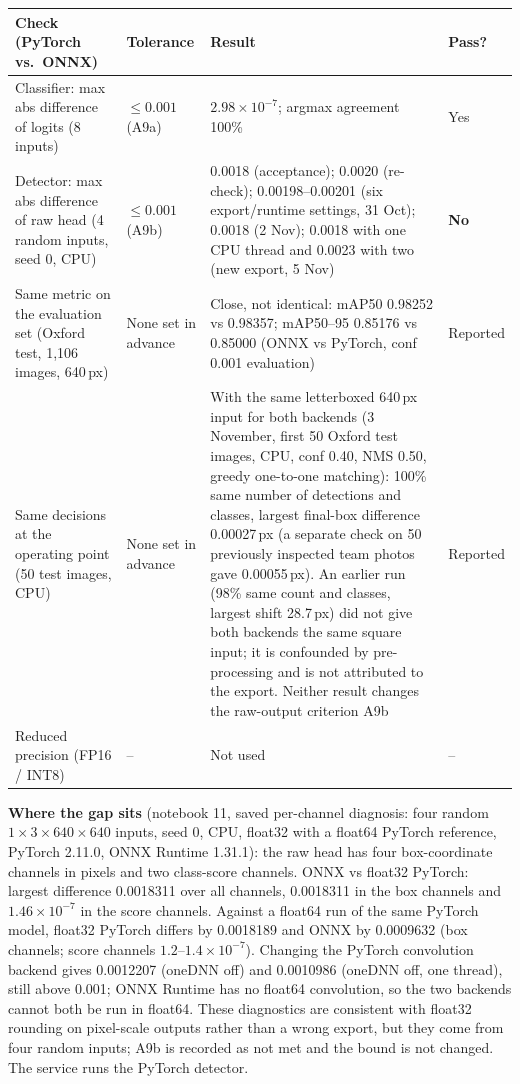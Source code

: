 \documentclass[11pt,a4paper]{article}
\begin{document}
{\small
\begin{tabularx}{\linewidth}{@{}P{5.0cm} P{2.0cm} Y l@{}}
\toprule
Check (PyTorch vs.\ ONNX) & Tolerance & Result & Pass? \\
\midrule
Classifier: max abs difference of logits (8 inputs) & $\leq 0.001$ (A9a) & $2.98\times10^{-7}$; argmax agreement 100\% & Yes \\
Detector: max abs difference of raw head (4 random inputs, seed 0, CPU) & $\leq 0.001$ (A9b) & 0.0018 (acceptance); 0.0020 (re-check); 0.00198--0.00201 (six export/runtime settings, 31 Oct); 0.0018 (2 Nov); 0.0018 with one CPU thread and 0.0023 with two (new export, 5 Nov) & \textbf{No} \\
Same metric on the evaluation set (Oxford test, 1,106 images, 640\,px) & None set in advance & Close, not identical: mAP50 0.98252 vs 0.98357; mAP50--95 0.85176 vs 0.85000 (ONNX vs PyTorch, conf 0.001 evaluation) & Reported \\
Same decisions at the operating point (50 test images, CPU) & None set in advance & With the same letterboxed 640\,px input for both backends (3 November, first 50 Oxford test images, CPU, conf 0.40, NMS 0.50, greedy one-to-one matching): 100\% same number of detections and classes, largest final-box difference 0.00027\,px (a separate check on 50 previously inspected team photos gave 0.00055\,px). An earlier run (98\% same count and classes, largest shift 28.7\,px) did not give both backends the same square input; it is confounded by pre-processing and is not attributed to the export. Neither result changes the raw-output criterion A9b & Reported \\
Reduced precision (FP16 / INT8) & -- & Not used & -- \\
\bottomrule
\end{tabularx}}

\smallskip
\textbf{Where the gap sits} (notebook 11, saved per-channel diagnosis: four random $1\times3\times640\times640$ inputs, seed 0, CPU, float32 with a float64 PyTorch reference, PyTorch 2.11.0, ONNX Runtime 1.31.1): the raw head has four box-coordinate channels in pixels and two class-score channels. ONNX vs float32 PyTorch: largest difference 0.0018311 over all channels, 0.0018311 in the box channels and $1.46\times10^{-7}$ in the score channels. Against a float64 run of the same PyTorch model, float32 PyTorch differs by 0.0018189 and ONNX by 0.0009632 (box channels; score channels $1.2$--$1.4\times10^{-7}$). Changing the PyTorch convolution backend gives 0.0012207 (oneDNN off) and 0.0010986 (oneDNN off, one thread), still above 0.001; ONNX Runtime has no float64 convolution, so the two backends cannot both be run in float64. These diagnostics are consistent with float32 rounding on pixel-scale outputs rather than a wrong export, but they come from four random inputs; A9b is recorded as not met and the bound is not changed. The service runs the PyTorch detector.
\end{document}
